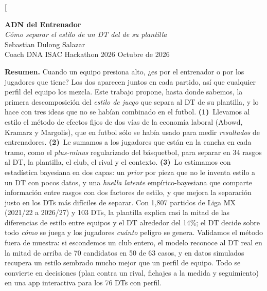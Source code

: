 \documentclass[10pt,a4paper,twocolumn]{article}
\begin{document}
\twocolumn[{%
\begin{center}
{\LARGE\bfseries ADN del Entrenador}\\[4pt]
{\large\itshape Cómo separar el estilo de un DT del de su plantilla}\\[8pt]
{\normalsize Sebastian Dulong Salazar}\\[3pt]{\small Coach DNA \textperiodcentered{} ISAC Hackathon 2026 \textperiodcentered{} Octubre de 2026}
\end{center}
\vspace{2pt}
\noindent\begin{minipage}{\textwidth}
\small\noindent\textbf{Resumen.} Cuando un equipo presiona alto, ¿es por el entrenador o por los jugadores que tiene? Los dos aparecen juntos en cada partido, así que cualquier perfil del equipo los mezcla. Este trabajo propone, hasta donde sabemos, la primera descomposición del \emph{estilo de juego} que separa al DT de su plantilla, y lo hace con tres ideas que no se habían combinado en el futbol. \textbf{(1)}~Llevamos al estilo el método de efectos fijos de dos vías de la economía laboral (Abowd, Kramarz y Margolis), que en futbol sólo se había usado para medir \emph{resultados} de entrenadores. \textbf{(2)}~Le sumamos a los jugadores que están en la cancha en cada tramo, como el \emph{plus-minus} regularizado del básquetbol, para separar en 34 rasgos al DT, la plantilla, el club, el rival y el contexto. \textbf{(3)}~Lo estimamos con estadística bayesiana en dos capas: un \emph{prior} por pieza que no le inventa estilo a un DT con pocos datos, y una \emph{huella latente} empírico-bayesiana que comparte información entre rasgos con dos factores de estilo, y que mejora la separación justo en los DTs más difíciles de separar. Con 1,807 partidos de Liga MX (2021/22 a 2026/27) y 103 DTs, la plantilla explica casi la mitad de las diferencias de estilo entre equipos y el DT alrededor del 14\%; el DT decide sobre todo \emph{cómo} se juega y los jugadores \emph{cuánto} peligro se genera. Validamos el método fuera de muestra: si escondemos un club entero, el modelo reconoce al DT real en la mitad de arriba de 70 candidatos en 50 de 63 casos, y en datos simulados recupera un estilo sembrado mucho mejor que un perfil de equipo. Todo se convierte en decisiones (plan contra un rival, fichajes a la medida y seguimiento) en una app interactiva para los 76 DTs con perfil.
\end{minipage}
\vspace{8pt}
\begin{center}
\centering

\end{center}}
\end{document}
